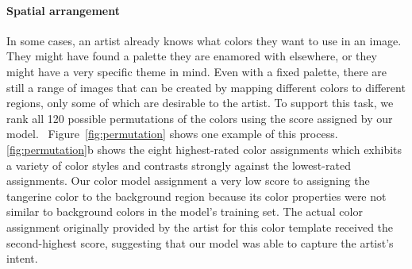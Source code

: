 \paragraph{Spatial arrangement} In some cases, an artist already knows what colors they want to use in an image. They might have found a palette they are enamored with elsewhere, or they might have a very specific theme in mind. Even with a fixed palette, there are still a range of images that can be created by mapping different colors to different regions, only some of which are desirable to the artist. To support this task, we rank all 120 possible permutations of the colors using the score assigned by our model.~ Figure~\ref{fig:permutation} shows one example of this process. \ref{fig:permutation}b shows the eight highest-rated color assignments which exhibits a variety of color styles and contrasts strongly against the lowest-rated assignments. Our color model assignment a very low score to assigning the tangerine color to the background region because its color properties were not similar to background colors in the model's training set. The actual color assignment originally provided by the artist for this color template received the second-highest score, suggesting that our model was able to capture the artist's intent.

